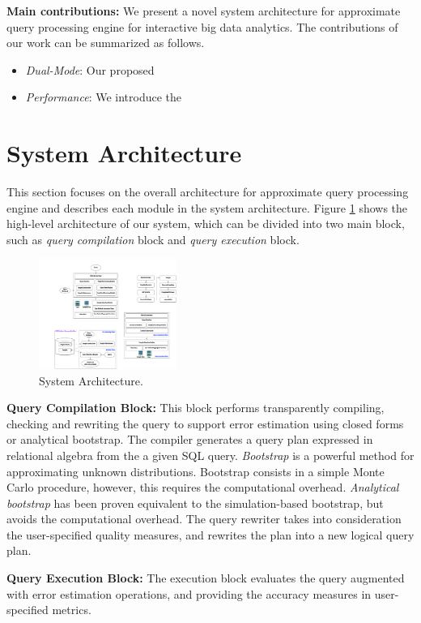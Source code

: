 \documentclass{sig-alternate-05-2015}
\newcommand{\bi}{\begin{itemize}}
\newcommand{\ei}{\end{itemize}}
\newcommand{\ii}{\item}
\begin{document}
\noindent
\textbf{Main contributions:} We present a novel system architecture for approximate query processing engine for interactive big data analytics. The contributions of our work can be summarized as follows.
\bi
\ii \textit{Dual-Mode}: 
Our proposed 
\ii \textit{Performance}: 
We introduce the 
\ei


\section{System Architecture}
This section focuses on the overall architecture for approximate query processing engine and describes each module in the system architecture. Figure \ref{fig:architecture} shows the high-level architecture of our system, which can be divided into two main block, such as \textit{query compilation} block and \textit{query execution} block.
\begin{figure}[htb]
        \centering
        \includegraphics[width=0.4\textwidth]{architecture.pdf}
        \caption{System Architecture.}
        \label{fig:architecture}
\end{figure}

\noindent
\textbf{Query Compilation Block:} 
This block performs transparently compiling, checking and rewriting the query to support error estimation using closed forms or analytical bootstrap. The compiler generates a query plan expressed in relational algebra from the a given SQL query. 
\textit{Bootstrap} is a powerful method for approximating unknown distributions. Bootstrap consists in a simple Monte Carlo procedure, however, this requires the computational overhead. \textit{Analytical bootstrap} has been proven equivalent to the simulation-based bootstrap, but avoids the computational overhead.
The query rewriter takes into consideration the user-specified quality measures, and rewrites the plan into a new logical query plan.

\noindent
\textbf{Query Execution Block:} 
The execution block evaluates the query augmented with error estimation operations, and providing the accuracy measures in user-specified metrics. 
\end{document}
